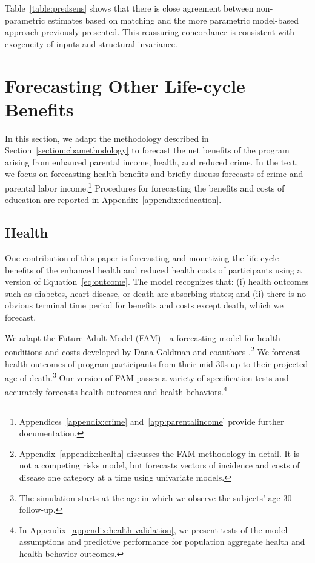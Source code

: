 Table~\ref{table:predsens} shows that there is close agreement between non-parametric estimates based on matching and the more parametric model-based approach previously presented. This reassuring concordance is consistent with exogeneity of inputs and structural invariance.

\section{Forecasting Other Life-cycle Benefits} \label{section:cbapractice}

\noindent In this section, we adapt the methodology described in Section~\ref{section:cbamethodology} to forecast the net benefits of the program arising from enhanced parental income, health, and reduced crime. In the text, we focus on forecasting health benefits and briefly discuss forecasts of crime and parental labor income.\footnote{Appendices~\ref{appendix:crime} and~\ref{app:parentalincome} provide further documentation.} Procedures for forecasting the benefits and costs of education are reported in Appendix~\ref{appendix:education}.

\subsection{Health}

\noindent One contribution of this paper is forecasting and monetizing the life-cycle benefits of the enhanced health and reduced health costs of participants using a version of Equation~\eqref{eq:outcome}. The model recognizes that: (i) health outcomes such as diabetes, heart disease, or death are absorbing states; and (ii) there is no obvious terminal time period for benefits and costs except death, which we forecast.

We adapt the Future Adult Model (FAM)---a forecasting model for health conditions and costs developed by Dana Goldman and coauthors \citep{Goldman_etal_2015_Future-Elderly-Model-Report}.\footnote{Appendix~\ref{appendix:health} discusses the FAM methodology in detail. It is not a competing risks model, but forecasts vectors of incidence and costs of disease one category at a time using univariate models.} We forecast health outcomes of program participants from their mid 30s up to their projected age of death.\footnote{The simulation starts at the age in which we observe the subjects' age-30 follow-up.} Our version of FAM passes a variety of specification tests and accurately forecasts health outcomes and health behaviors.\footnote{In Appendix~\ref{appendix:health-validation}, we present tests of the model assumptions and predictive performance for population aggregate health and health behavior outcomes.}

